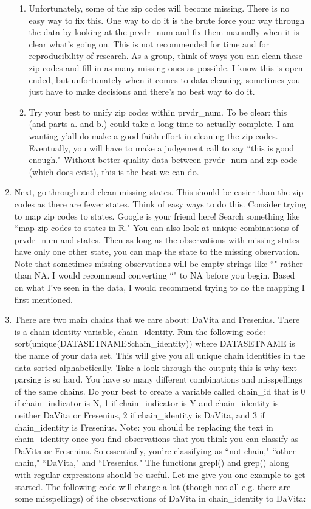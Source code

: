 \documentclass{article}
\begin{document}
\begin{enumerate}
\begin{enumerate}
			\item Unfortunately, some of the zip codes will become missing. There is no easy way to fix this. One way to do it is the brute force your way through the data by looking at the prvdr\_num and fix them manually when it is clear what's going on. This is not recommended for time and for reproducibility of research. As a group, think of ways you can clean these zip codes and fill in as many missing ones as possible. I know this is open ended, but unfortunately when it comes to data cleaning, sometimes you just have to make decisions and there's no best way to do it.
			\item Try your best to unify zip codes within prvdr\_num. To be clear: this (and parts a. and b.) could take a long time to actually complete. I am wanting y'all do make a good faith effort in cleaning the zip codes. Eventually, you will have to make a judgement call to say ``this is good enough." Without better quality data between prvdr\_num and zip code (which does exist), this is the best we can do.
		\end{enumerate}
		\item Next, go through and clean missing states. This should be easier than the zip codes as there are fewer states. Think of easy ways to do this. Consider trying to map zip codes to states. Google is your friend here! Search something like ``map zip codes to states in R." You can also look at unique combinations of prvdr\_num and states. Then as long as the observations with missing states have only one other state, you can map the state to the missing observation. Note that sometimes missing observations will be empty strings like ``" rather than NA. I would recommend converting ``" to NA before you begin. Based on what I've seen in the data, I would recommend trying to do the mapping I first mentioned.
		\item There are two main chains that we care about: DaVita and Fresenius. There is a chain identity variable, chain\_identity. Run the following code: sort(unique(DATASETNAME\$chain\_identity)) where DATASETNAME is the name of your data set. This will give you all unique chain identities in the data sorted alphabetically. Take a look through the output; this is why text parsing is so hard. You have so many different combinations and misspellings of the same chains. Do your best to create a variable called chain\_id that is 0 if chain\_indicator is N, 1 if chain\_indicator is Y and chain\_identity is neither DaVita or Fresenius, 2 if chain\_identity is DaVita, and 3 if chain\_identity is Fresenius. Note: you should be replacing the text in chain\_identity once you find observations that you think you can classify as DaVita or Fresenius. So essentially, you're classifying as ``not chain," ``other chain," ``DaVita," and ``Fresenius." The functions grepl() and grep() along with regular expressions should be useful. Let me give you one example to get started. The following code will change a lot (though not all e.g. there are some misspellings) of the observations of DaVita in chain\_identity to DaVita:
		

\end{enumerate}
\end{document}
